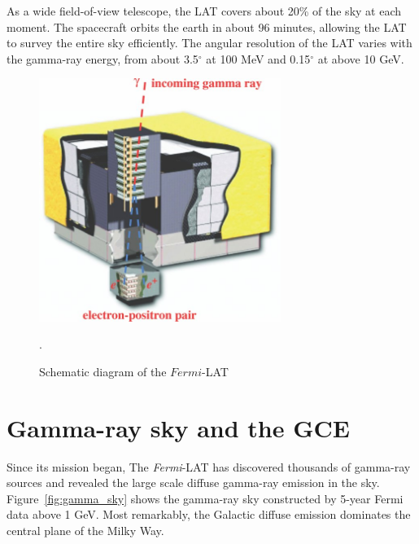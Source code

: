\documentclass[doublespace,nopageskip]{VTthesis} %
\begin{document}
As a wide field-of-view telescope, the LAT covers about 20\% of the sky at each moment. The spacecraft orbits the earth in about 96 minutes, allowing the LAT to survey the entire sky efficiently. The angular resolution of the LAT varies with the gamma-ray energy, from about 3.5$^\circ$ at 100 MeV and 0.15$^\circ$ at above 10 GeV.

\begin{figure}[htb]
    \centering
    \includegraphics[width=0.7\textwidth]{Figures/Intro/lat.jpg}
    \caption{Schematic diagram of the $Fermi$-LAT~\cite{2009ApJ...697.1071A}}.
    \label{fig:lat}
\end{figure}

\section{Gamma-ray sky and the GCE}

Since its mission began, The \textit{Fermi}-LAT has discovered thousands of gamma-ray sources and revealed the large scale diffuse gamma-ray emission in the sky. Figure~\ref{fig:gamma_sky} shows the gamma-ray sky constructed by 5-year Fermi data above 1 GeV. Most remarkably, the Galactic diffuse emission dominates the central plane of the Milky Way.
\end{document}
